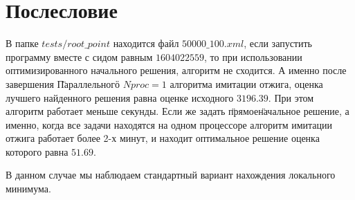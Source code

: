 \documentclass[a4peper, 12pt, titlepage, finall]{extreport}
\begin{document}

    \section{Послесловие}
        В папке $tests/root\_point$ находится файл $50000\_100.xml$, если запустить программу вместе с сидом равным $1604022559$, то при использовании оптимизированного начального решения,
        алгоритм не сходится. А именно после завершения \"Параллельного\" $Nproc = 1$ алгоритма имитации отжига, оценка лучшего найденного решения равна оценке исходного $3196.39$.
        При этом алгоритм работает меньше секунды.
        Если же задать \"прямое\" начальное решение, а именно, когда все задачи находятся на одном процессоре алгоритм имитации отжига работает более 2-х минут, и находит оптимальное решение
        оценка которого равна $51.69$.

        В данном случае мы наблюдаем стандартный вариант нахождения локального минимума.
\end{document}
